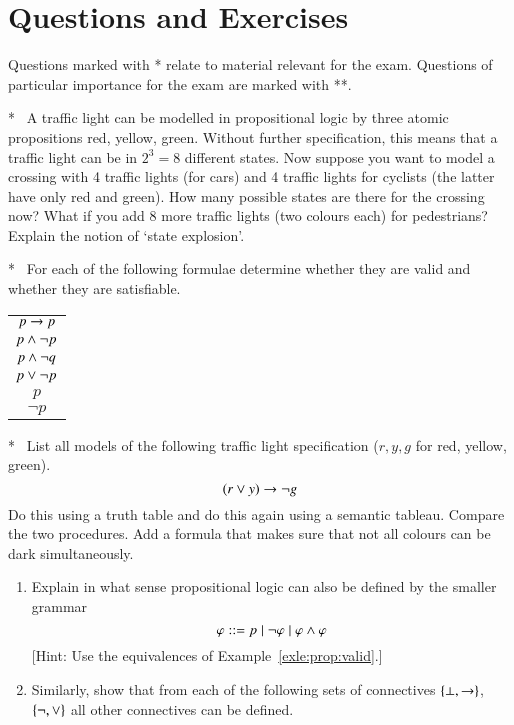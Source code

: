 \section{Questions and Exercises}
Questions marked with * relate to material relevant for the
exam. Questions of particular importance for the exam are marked with
**.
\begin{question}* \ 
  A traffic light can be modelled in propositional logic by three
  atomic propositions red, yellow, green. Without further
  specification, this means that a traffic light can be in $2^3=8$
  different states. Now suppose you want to model a crossing with 4
  traffic lights (for cars) and 4 traffic lights for cyclists (the
  latter have only red and green). How many possible states are there
  for the crossing now? What if you add 8 more traffic lights (two
  colours each) for pedestrians? Explain the notion of `state
  explosion'.
\end{question}

\begin{question}* \
For each of the following formulae determine whether they are valid
and whether they are satisfiable. 
\begin{center}
\begin{tabular}{c}
$p\rightarrow p$\\
$p\wedge\neg p$\\
$p\wedge\neg q$\\
$p\vee\neg p$\\
$p$\\
$\neg p$
\end{tabular}
\end{center}

\end{question}

\begin{question}* \
  List all models of the following traffic light specification
  ($r,y,g$ for red, yellow, green).
\[
(r\vee y)\rightarrow \neg g
\]
Do this using a truth table and do this again using a semantic
tableau. Compare the two procedures.  Add a formula that makes sure
that not all colours can be dark simultaneously.
\end{question}
 
\begin{question}
\begin{enumerate}
\item
  Explain in what sense propositional logic can also be defined by the
  smaller grammar
%
$$\varphi ::= p \mid  \neg\varphi \mid \varphi\wedge\varphi$$
%
 [Hint: Use the equivalences of Example~\ref{exle:prop:valid}.]
\item Similarly, show that from each of the following sets of
  connectives $\{\bot,\rightarrow\}$, $\{\neg,\vee\}$ all other connectives
  can be defined. 
\end{enumerate}
\end{question}

